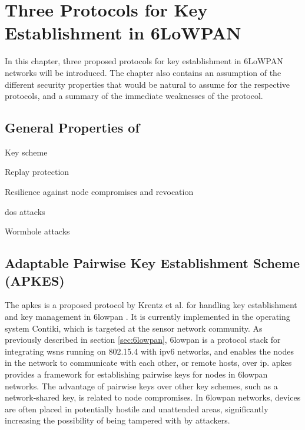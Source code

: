 \chapter{Three Protocols for Key Establishment in 6LoWPAN}
\label{chp:protocols}

In this chapter, three proposed protocols for key establishment in 6LoWPAN networks will be introduced. The chapter also contains an assumption of the different security properties that would be natural to assume for the respective protocols, and a summary of the immediate weaknesses of the protocol.


\section{General Properties of }


\begin{list}{•}{}


\item Key scheme

\item Replay protection

\item Resilience against node compromises and revocation

\item \gls{dos} attacks

\item Wormhole attacks

\end{list}

\section{Adaptable Pairwise Key Establishment Scheme (APKES)}


The \gls{apkes} is a proposed protocol by Krentz et al. for handling key establishment and key management in \gls{6lowpan} \cite{krentz20136lowpan}. It is currently implemented in the operating system Contiki, which is targeted at the sensor network community. As previously described in section \ref{sec:6lowpan}, \gls{6lowpan} is a protocol stack for integrating \gls{wsn}s running on 802.15.4 with \gls{ip}v6 networks, and enables the nodes in the network to communicate with each other, or remote hosts, over \gls{ip}. \gls{apkes} provides a framework for establishing pairwise keys for nodes in \gls{6lowpan} networks. The advantage of pairwise keys over other key schemes, such as a network-shared key, is related to node compromises. In \gls{6lowpan} networks, devices are often placed in potentially hostile and unattended areas, significantly increasing the possibility of being tampered with by attackers.

